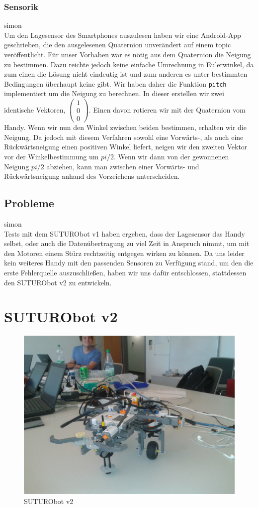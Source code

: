 \documentclass[8pt]{article}
\begin{document}
\subsubsection{Sensorik} 
simon\\
Um den Lagesensor des Smartphones auszulesen haben wir eine Android-App geschrieben, die den ausgelesenen Quaternion unverändert auf einem topic veröffentlicht.
Für unser Vorhaben war es nötig aus dem Quaternion die Neigung zu bestimmen. Dazu reichte jedoch keine einfache Umrechnung in Eulerwinkel, da zum einen die Lösung nicht eindeutig ist und zum anderen es unter bestimmten Bedingungen überhaupt keine gibt. Wir haben daher die Funktion \texttt{pitch} implementiert um die Neigung zu berechnen. In dieser erstellen wir zwei identische Vektoren, $\left( \begin{array}{c} 1 \\ 0 \\ 0
\end{array} \right)$. Einen davon rotieren wir mit der Quaternion vom Handy. Wenn wir nun den Winkel zwischen beiden bestimmen, erhalten wir die Neigung. Da jedoch mit diesem Verfahren sowohl eine Vorwärts-, als auch eine Rückwärtsneigung einen positiven Winkel liefert, neigen wir den zweiten Vektor vor der Winkelbestimmung um $pi / 2$. Wenn wir dann von der gewonnenen Neigung $pi / 2$ abziehen, kann man zwischen einer Vorwärts- und Rückwärtsneigung anhand des Vorzeichens unterscheiden.

\subsection{Probleme} simon\\
Tests mit dem SUTURObot v1 haben ergeben, dass der Lagesensor das Handy selbst, oder auch die Datenübertragung zu viel Zeit in Anspruch nimmt, um mit den Motoren einem Stürz rechtzeitig entgegen wirken zu können. Da uns leider kein weiteres Handy mit den passenden Sensoren zu Verfügung stand, um den die erste Fehlerquelle auszuschließen, haben wir uns dafür entschlossen, stattdessen den SUTURObot v2 zu entwickeln.

\section{SUTURObot v2}
\begin{figure}[h]
  \begin{center}
    \includegraphics[width=.5\textwidth]{pictures/SUTURObot-v2.jpg}
  \end{center}
  \caption{SUTURObot v2}
  \label{fig:SUTURObot2}
\end{figure}
\end{document}
